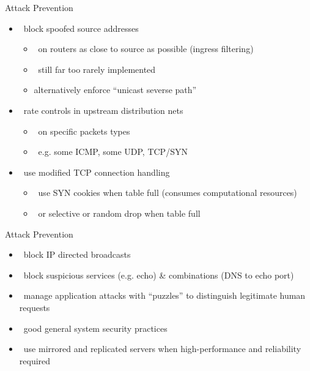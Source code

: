\documentclass{beamer}
\begin{document}
\begin{frame}{Attack Prevention }
  \begin{itemize}
  \item  block spoofed source addresses 
    \begin{itemize}
    \item  on routers as close to source as possible (ingress filtering)
    \item  still far too rarely implemented 
    \item  alternatively enforce ``unicast severse path''
    \end{itemize}
  \item  rate controls in upstream distribution nets 
    \begin{itemize}
    \item  on specific packets types 
    \item  e.g. some ICMP, some UDP, TCP/SYN 
    \end{itemize}
  \item  use modified TCP connection handling 
    \begin{itemize}
    \item  use SYN cookies when table full (consumes computational resources)
    \item  or selective or random drop when table full 
    \end{itemize}
  \end{itemize}
\end{frame}

\begin{frame}{Attack Prevention }
  \begin{itemize}
  \item  block IP directed broadcasts 
  \item  block suspicious services (e.g. echo) \& combinations (DNS to
    echo port)
  \item  manage application attacks with “puzzles” to 
    distinguish legitimate human requests 
  \item  good general system security practices 
  \item  use mirrored and replicated servers when 
    high-performance and reliability required
  \end{itemize}
\end{frame}
\end{document}
